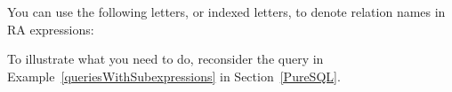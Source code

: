 \documentclass[11pt]{article}
\begin{document}
You can use the following letters, or indexed letters, to denote relation names in RA expressions:

\begin{center}
\end{center}

To illustrate what you need to do, reconsider the query in Example~\ref{queriesWithSubexpressions} in Section~\ref{PureSQL}.
\end{document}
